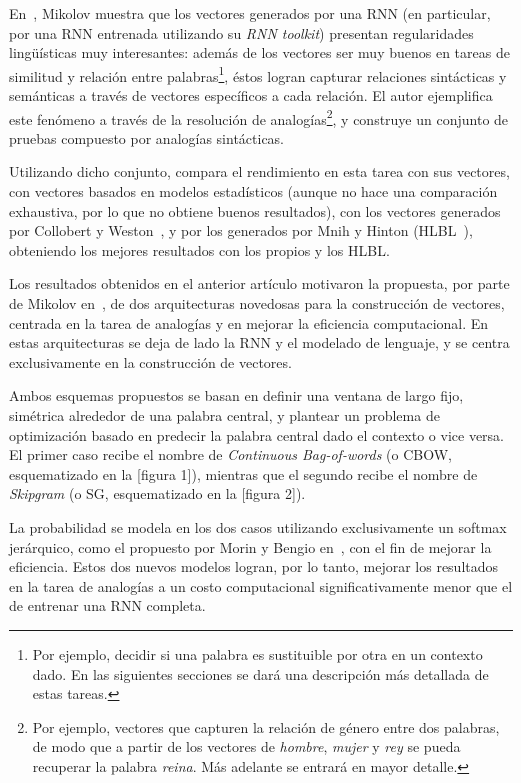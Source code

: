 En~\cite{Mikolov2013a}, Mikolov muestra que los vectores generados por una RNN (en particular, por
una RNN entrenada utilizando su \textit{RNN toolkit}) presentan regularidades lingüísticas muy
interesantes: además de los vectores ser muy buenos en tareas de similitud y relación entre
palabras\footnote{Por ejemplo, decidir si una palabra es sustituible por otra en un contexto
dado. En las siguientes secciones se dará una descripción más detallada de estas tareas.}, éstos
logran capturar relaciones sintácticas y semánticas a través de vectores específicos a cada
relación. El autor ejemplifica este fenómeno a través de la resolución de analogías\footnote{Por
ejemplo, vectores que capturen la relación de género entre dos palabras, de modo que a partir de los
vectores de \textit{hombre}, \textit{mujer} y \textit{rey} se pueda recuperar la palabra
\textit{reina}. Más adelante se entrará en mayor detalle.}, y construye un conjunto de pruebas
compuesto por analogías sintácticas.

Utilizando dicho conjunto, compara el rendimiento en esta tarea con sus vectores, con vectores
basados en modelos estadísticos (aunque no hace una comparación exhaustiva, por lo que no obtiene
buenos resultados), con los vectores generados por Collobert y Weston~\cite{CollobertWeston2008}, y
por los generados por Mnih y Hinton (HLBL~\cite{MnihHinton2009}), obteniendo los mejores resultados
con los propios y los HLBL\@.

Los resultados obtenidos en el anterior artículo motivaron la propuesta, por parte de Mikolov
en~\cite{Mikolov2013b}, de dos arquitecturas novedosas para la construcción de vectores, centrada en
la tarea de analogías y en mejorar la eficiencia computacional. En estas arquitecturas se deja de
lado la RNN y el modelado de lenguaje, y se centra exclusivamente en la construcción de vectores.

Ambos esquemas propuestos se basan en definir una ventana de largo fijo, simétrica alrededor de una
palabra central, y plantear un problema de optimización basado en predecir la palabra central dado
el contexto o vice versa. El primer caso recibe el nombre de \textit{Continuous Bag-of-words} (o
CBOW, esquematizado en la [figura 1]), mientras que el segundo recibe el nombre de \textit{Skipgram}
(o SG, esquematizado en la [figura 2]).

La probabilidad se modela en los dos casos utilizando exclusivamente un softmax jerárquico, como el
propuesto por Morin y Bengio en~\cite{MorinBengio2005}, con el fin de mejorar la eficiencia. Estos
dos nuevos modelos logran, por lo tanto, mejorar los resultados en la tarea de analogías a un costo
computacional significativamente menor que el de entrenar una RNN completa.

